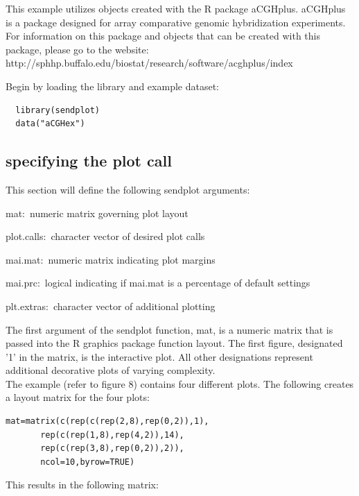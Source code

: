 \documentclass[]{article}
\begin{document}
 This example utilizes objects created with the R package aCGHplus. aCGHplus is a package designed for array comparative genomic hybridization experiments. For information on this package and objects that can be created with this package, please go to the website: \\http://sphhp.buffalo.edu/biostat/research/software/acghplus/index

\indent Begin by loading the library and example dataset:

\begin{verbatim}
  library(sendplot)
  data("aCGHex")
\end{verbatim}



\subsection{specifying the plot call}

This section will define the following sendplot arguments:

\begin{description}
   \item{mat:~}{numeric matrix governing plot layout}
   \item{plot.calls:~}{character vector of desired plot calls}
   \item{mai.mat:~}{numeric matrix indicating plot margins}
   \item{mai.prc:~}{logical indicating if mai.mat is a percentage of default settings}
   \item{plt.extras:~}{character vector of additional plotting}
\end{description}


\indent The first argument of the sendplot function, mat, is a numeric matrix that is passed into the R graphics package function layout. The first figure, designated '1' in the matrix, is the interactive plot. All other designations represent additional decorative plots of varying complexity. \\
\indent The example (refer to figure 8) contains four different plots. The following creates a layout matrix for the four plots:

\begin{verbatim}
mat=matrix(c(rep(c(rep(2,8),rep(0,2)),1),
       rep(c(rep(1,8),rep(4,2)),14),
       rep(c(rep(3,8),rep(0,2)),2)),
       ncol=10,byrow=TRUE)
\end{verbatim}

\indent This results in the following matrix:
\end{document}
